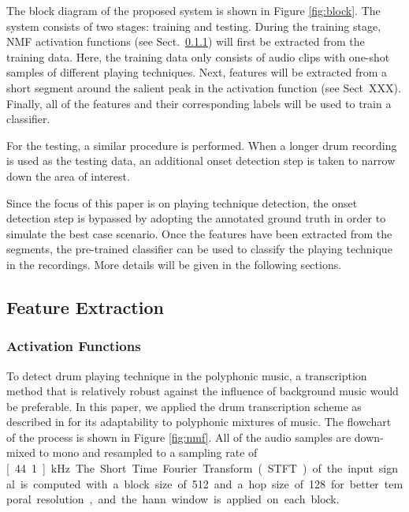 \documentclass{article}
\begin{document}
{{{{{The block diagram of the proposed system is shown in Figure \ref{fig:block}. The system consists of two stages: training and testing. During the training stage, NMF {\color{red}{already introduced?}} activation functions (see Sect.~\ref{sssec:activ}) will first be extracted from the training data. Here, the training data only consists of audio clips with one-shot samples of different playing techniques. Next, features will be extracted from a short segment around the salient peak in the activation function (see Sect\.~XXX). Finally, all of the features and their corresponding labels will be used to train a classifier. {\color{red}{introduce the classes here} For the testing, a similar procedure is performed. When a longer drum recording is used as the testing data, an additional onset detection step is taken to narrow down the area of interest. {\color{red}{the following sentence maybe later --- not really system overview} Since the focus of this paper is on playing technique detection, the onset detection step is bypassed by adopting the annotated ground truth in order to simulate the best case scenario. Once the features have been extracted from the segments, the pre-trained classifier can be used to classify the playing technique in the recordings. More details will be given in the following sections. 
 
\subsection{Feature Extraction}\label{ssec:featuresExtract}
\subsubsection{Activation Functions}
\label{sssec:activ}

To detect drum playing technique in the polyphonic music, a transcription method that is relatively robust against the influence of background music would be preferable. In this paper, we applied the drum transcription scheme as described in \cite{Wu2015a} for its adaptability to polyphonic mixtures of music. The flowchart of the process is shown in Figure \ref{fig:nmf}. All of the audio samples are down-mixed to mono and resampled to a sampling rate of \unit[44.1]{kHz}. The Short Time Fourier Transform (STFT) of the input signal is computed with a block size of 512 and a hop size of 128 for better temporal resolution, and the hann window is applied on each block. 

}}}}}}}
\end{document}
